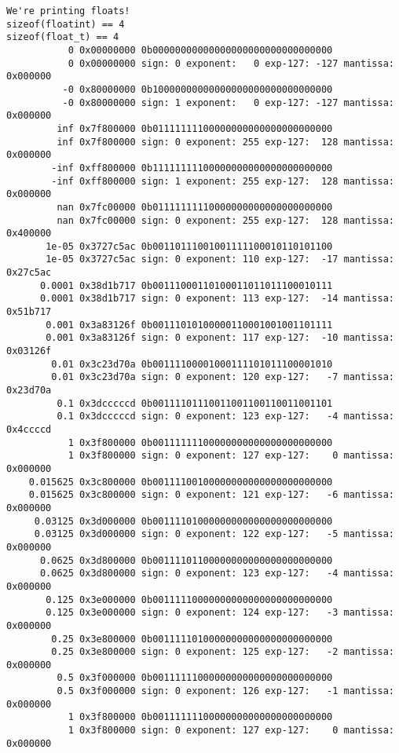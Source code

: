 \documentclass[11pt]{article}
\begin{document}
\begin{verbatim}
We're printing floats!
sizeof(floatint) == 4
sizeof(float_t) == 4
           0 0x00000000 0b00000000000000000000000000000000
           0 0x00000000 sign: 0 exponent:   0 exp-127: -127 mantissa: 0x000000
          -0 0x80000000 0b10000000000000000000000000000000
          -0 0x80000000 sign: 1 exponent:   0 exp-127: -127 mantissa: 0x000000
         inf 0x7f800000 0b01111111100000000000000000000000
         inf 0x7f800000 sign: 0 exponent: 255 exp-127:  128 mantissa: 0x000000
        -inf 0xff800000 0b11111111100000000000000000000000
        -inf 0xff800000 sign: 1 exponent: 255 exp-127:  128 mantissa: 0x000000
         nan 0x7fc00000 0b01111111110000000000000000000000
         nan 0x7fc00000 sign: 0 exponent: 255 exp-127:  128 mantissa: 0x400000
       1e-05 0x3727c5ac 0b00110111001001111100010110101100
       1e-05 0x3727c5ac sign: 0 exponent: 110 exp-127:  -17 mantissa: 0x27c5ac
      0.0001 0x38d1b717 0b00111000110100011011011100010111
      0.0001 0x38d1b717 sign: 0 exponent: 113 exp-127:  -14 mantissa: 0x51b717
       0.001 0x3a83126f 0b00111010100000110001001001101111
       0.001 0x3a83126f sign: 0 exponent: 117 exp-127:  -10 mantissa: 0x03126f
        0.01 0x3c23d70a 0b00111100001000111101011100001010
        0.01 0x3c23d70a sign: 0 exponent: 120 exp-127:   -7 mantissa: 0x23d70a
         0.1 0x3dcccccd 0b00111101110011001100110011001101
         0.1 0x3dcccccd sign: 0 exponent: 123 exp-127:   -4 mantissa: 0x4ccccd
           1 0x3f800000 0b00111111100000000000000000000000
           1 0x3f800000 sign: 0 exponent: 127 exp-127:    0 mantissa: 0x000000
    0.015625 0x3c800000 0b00111100100000000000000000000000
    0.015625 0x3c800000 sign: 0 exponent: 121 exp-127:   -6 mantissa: 0x000000
     0.03125 0x3d000000 0b00111101000000000000000000000000
     0.03125 0x3d000000 sign: 0 exponent: 122 exp-127:   -5 mantissa: 0x000000
      0.0625 0x3d800000 0b00111101100000000000000000000000
      0.0625 0x3d800000 sign: 0 exponent: 123 exp-127:   -4 mantissa: 0x000000
       0.125 0x3e000000 0b00111110000000000000000000000000
       0.125 0x3e000000 sign: 0 exponent: 124 exp-127:   -3 mantissa: 0x000000
        0.25 0x3e800000 0b00111110100000000000000000000000
        0.25 0x3e800000 sign: 0 exponent: 125 exp-127:   -2 mantissa: 0x000000
         0.5 0x3f000000 0b00111111000000000000000000000000
         0.5 0x3f000000 sign: 0 exponent: 126 exp-127:   -1 mantissa: 0x000000
           1 0x3f800000 0b00111111100000000000000000000000
           1 0x3f800000 sign: 0 exponent: 127 exp-127:    0 mantissa: 0x000000

\end{verbatim}
\end{document}
